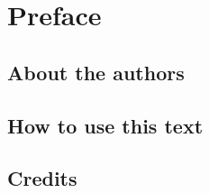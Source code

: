 %
\chapter*{Preface}
\label{chap:ipreface}
\section*{About the authors}

\section*{How to use this text}

\section*{Credits}

